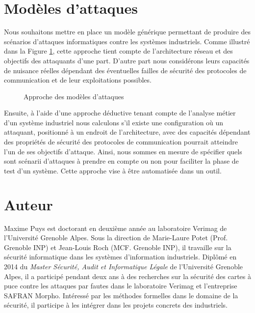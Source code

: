 \documentclass{article}
\begin{document}
\section{Modèles d'attaques}\label{sec:models}

Nous souhaitons mettre en place un modèle générique permettant de produire des
scénarios d'attaques informatiques contre les systèmes industriels.
Comme illustré dans la Figure \ref{fig:models}, cette approche tient compte de
l'architecture réseau et des objectifs des attaquants d'une part.
D'autre part nous considérons leurs capacités de nuisance réelles dépendant des
éventuelles failles de sécurité des protocoles de communication et de leur
exploitations possibles.

\begin{figure}[htb]
    \centering
    \resizebox{.6\textwidth}{!}{
        
    }
    \caption{Approche des modèles d'attaques}
    \label{fig:models}
\end{figure}

Ensuite, à l'aide d'une approche déductive tenant compte de l’analyse métier
d’un système industriel nous calculons s'il existe une configuration où un
attaquant, positionné à un endroit de l'architecture, avec des capacités
dépendant des propriétés de sécurité des protocoles de communication pourrait
atteindre l'un de ses objectifs d'attaque.
Ainsi, nous sommes en mesure de spécifier quels sont scénarii d’attaques à
prendre en compte ou non pour faciliter la phase de test d'un système.
Cette approche vise à être automatisée dans un outil.

\section{Auteur}

Maxime Puys est doctorant en deuxième année au laboratoire Verimag de
l'Université Grenoble Alpes.
Sous la direction de Marie-Laure Potet (Prof. Grenoble INP) et Jean-Louis Roch
(MCF. Grenoble INP), il travaille sur la sécurité informatique dans les
systèmes d'information industriels.
Diplômé en 2014 du {\em Master Sécurité, Audit et Informatique Légale} de
l'Université Grenoble Alpes, il a participé pendant deux ans à des recherches
sur la sécurité des cartes à puce contre les attaques par fautes dans le
laboratoire Verimag et l'entreprise SAFRAN Morpho.
Intéressé par les méthodes formelles dans le domaine de la sécurité, il
participe à les intégrer dans les projets concrets des industriels.



\end{document}
